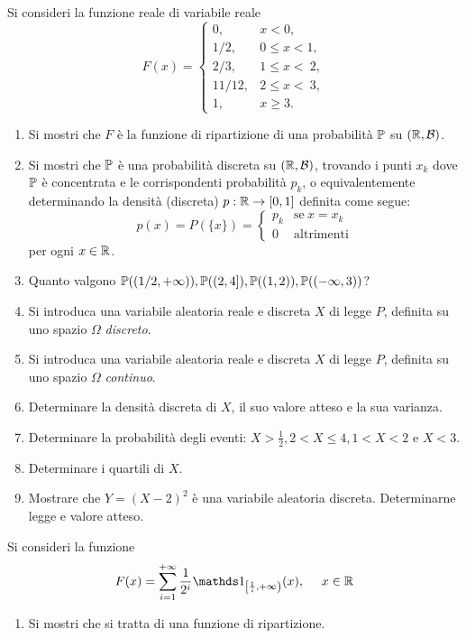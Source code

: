\Esercizio{}

Si consideri la funzione reale di variabile reale
\begin{equation*}
F(x) =
\begin{cases}
0, & x< 0,\\
1/2, & 0\leq x< 1,\\
2/3, & 1\leq x< \ 2,\\
11/12, & 2\leq x< \ 3,\\
1, & x\geq 3.
\end{cases}
\end{equation*}
\begin{enumerate}
\item Si mostri che $F$ è la funzione di ripartizione di una probabilità $\mathbb{P}$ su $(\mathbb{R} ,\mathcal{B})$.
\item Si mostri che $\mathbb{P}$ è una probabilità discreta su $(\mathbb{R} ,\mathcal{B})$, trovando i punti $x_{k}$ dove $\mathbb{P}$ è concentrata e le corrispondenti probabilità $p_{k}$, o equivalentemente determinando la densità (discreta) $p:\mathbb{R}\rightarrow [0,1]$ definita come segue:
\begin{equation*}
p(x) =P(\{x\}) =
\begin{cases}
p_{k} & \text{se} \ x=x_{k}\\
0 & \text{altrimenti}
\end{cases}
\end{equation*}
per ogni $x\in \mathbb{R}$.
\item Quanto valgono $\mathbb{P}((1/2,+\infty)) ,\mathbb{P}((2,4]) ,\mathbb{P}((1,2)) ,\mathbb{P}((-\infty ,3))$?
\item Si introduca una variabile aleatoria reale e discreta $X$ di legge $P$, definita su uno spazio $\Omega $ \textit{discreto}.
\item Si introduca una variabile aleatoria reale e discreta $X$ di legge $P$, definita su uno spazio $\Omega $ \textit{continuo}.
\item Determinare la densità discreta di $X$, il suo valore atteso e la sua varianza.
\item Determinare la probabilità degli eventi: $X >\frac{1}{2} ,2< X\leq 4,1< X< 2$ e $X< 3$.
\item Determinare i quartili di $X$.
\item Mostrare che $Y=(X-2)^{2}$ è una variabile aleatoria discreta. Determinarne legge e valore atteso.
\end{enumerate}

\Esercizio{}

Si consideri la funzione
\begin{equation*}
F(x) =\sum\limits_{i=1}^{+\infty }\frac{1}{2^{i}}\Ind_{\left[\frac{1}{i} ,+\infty \right)}(x) ,\ \ \ \ x\in \RR
\end{equation*}
\begin{enumerate}
\item Si mostri che si tratta di una funzione di ripartizione.
\end{enumerate}

